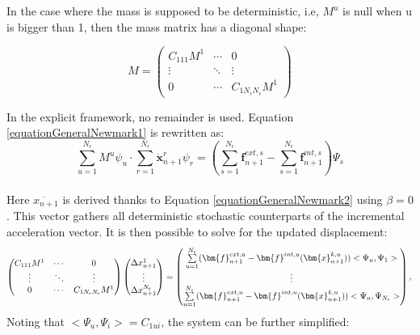 \documentclass[oneside,11pt,times]{book}
\begin{document}
In the case where the mass is supposed to be deterministic, i.e, $M^{u}$ is null when u is bigger than 1, then the mass matrix has a diagonal shape:

\begin{equation}
\label{equationMassStochSimp}M =
\begin{pmatrix}
     C_{111} {M}^{1}     & \cdots & 0 \\
    \vdots & \ddots & \vdots \\
    0      & \cdots &  C_{1N_{\epsilon}N_{\epsilon}} {M}^{1}
\end{pmatrix}
\end{equation}

In the explicit framework, no remainder is used. Equation \eqref{equationGeneralNewmark1} is rewritten as:
\begin{equation} \label{equationGeneralNewmark1}
\sum\limits_{u=1}^{N_{\epsilon}} {M}^{u}\psi_{u} \cdot \sum\limits_{r=1}^{N_{\epsilon}}\ddot{\bm{x}}^{r}_{n+1}\psi_{r}  =   (\sum\limits_{s=1}^{N_{\epsilon}}\bm{f}^{ext,s}_{n+1}  - \sum\limits_{s=1}^{N_{\epsilon}}\bm{f}^{int,s}_{n+1})\Psi_{s}
 \end{equation} \\
 Here $\ddot{x_{n+1}}$ is derived thanks to Equation \eqref{equationGeneralNewmark2} using $\beta = 0$. This vector gathers all deterministic stochastic counterparts of the incremental acceleration vector. It is then possible to solve for the updated displacement:
\begin{equation}
\label{equationStochasticGalerkinNewtonRaphsonFinalSystem}
\begin{pmatrix}
     C_{111} {M}^{1}     & \cdots & 0 \\
    \vdots & \ddots & \vdots \\
    0      & \cdots &  C_{1N_{\epsilon}N_{\epsilon}} {M}^{1}
\end{pmatrix}
\begin{pmatrix}
\Delta{x^{1}_{n+1}} \\
\vdots \\
\Delta{x^{N_{\epsilon}}_{n+1}}
\end{pmatrix}
= \begin{pmatrix}
\sum\limits_{u=1}^{N_{\epsilon}} (\bm{f}^{ext,u}_{n+1} - \bm{f}^{int,u}(\bm{x}^{k,u}_{n+1})) <\Psi_u,\Psi_1> \\
\vdots \\
\sum\limits_{u=1}^{N_{\epsilon}} (\bm{f}^{ext,u}_{n+1} - \bm{f}^{int,u}(\bm{x}^{k,u}_{n+1})) <\Psi_u,\Psi_{N_{\epsilon}}>
\end{pmatrix},\\
\end{equation}
 Noting that $<\Psi_{u},\Psi_{i}> = C_{1ui}$, the system can be further simplified:
\end{document}
